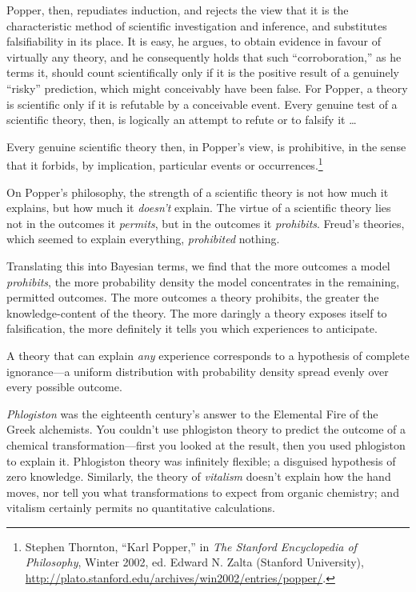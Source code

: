 {
 Popper, then, repudiates induction, and rejects the view that it
is the characteristic method of scientific investigation and inference,
and substitutes falsifiability in its place. It is easy, he argues, to
obtain evidence in favour of virtually any theory, and he consequently
holds that such ``corroboration,''
as he terms it, should count scientifically only if it is the positive
result of a genuinely ``risky''
prediction, which might conceivably have been false. For Popper, a
theory is scientific only if it is refutable by a conceivable event.
Every genuine test of a scientific theory, then, is logically an
attempt to refute or to falsify it \ldots}

{
 Every genuine scientific theory then, in Popper's
view, is prohibitive, in the sense that it forbids, by implication,
particular events or occurrences.\footnote{Stephen Thornton, ``Karl
Popper,'' in \textit{The Stanford Encyclopedia of
Philosophy}, Winter 2002, ed. Edward N. Zalta (Stanford University),
\url{http://plato.stanford.edu/archives/win2002/entries/popper/}.}}

{
 On Popper's philosophy, the strength of a
scientific theory is not how much it explains, but how much it
\textit{doesn't} explain. The virtue of a scientific
theory lies not in the outcomes it \textit{permits}, but in the
outcomes it \textit{prohibits}. Freud's theories, which
seemed to explain everything, \textit{prohibited} nothing.}

{
 Translating this into Bayesian terms, we find that the more
outcomes a model \textit{prohibits}, the more probability density the
model concentrates in the remaining, permitted outcomes. The more
outcomes a theory prohibits, the greater the knowledge-content of the
theory. The more daringly a theory exposes itself to falsification, the
more definitely it tells you which experiences to anticipate.}

{
 A theory that can explain \textit{any} experience corresponds to a
hypothesis of complete ignorance---a uniform distribution with
probability density spread evenly over every possible outcome.}

{
 \textit{Phlogiston} was the eighteenth century's
answer to the Elemental Fire of the Greek alchemists. You
couldn't use phlogiston theory to predict the outcome
of a chemical transformation---first you looked at the result, then you
used phlogiston to explain it. Phlogiston theory was infinitely
flexible; a disguised hypothesis of zero knowledge. Similarly, the
theory of \textit{vitalism} doesn't explain how the
hand moves, nor tell you what transformations to expect from organic
chemistry; and vitalism certainly permits no quantitative
calculations.}

